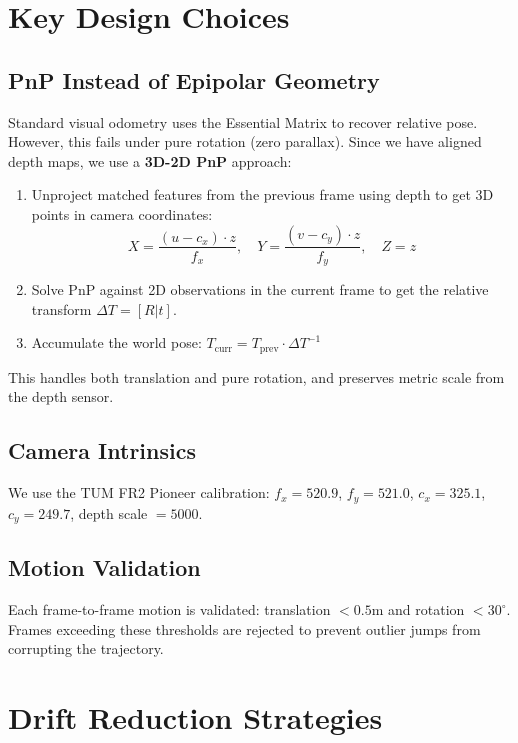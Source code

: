 \documentclass[12pt,a4paper]{article}
\begin{document}
\section{Key Design Choices}

\subsection{PnP Instead of Epipolar Geometry}

Standard visual odometry uses the Essential Matrix to recover relative pose. However, this fails under pure rotation (zero parallax). Since we have aligned depth maps, we use a \textbf{3D-2D PnP} approach:

\begin{enumerate}
    \item Unproject matched features from the previous frame using depth to get 3D points in camera coordinates:
    \[
        X = \frac{(u - c_x) \cdot z}{f_x}, \quad
        Y = \frac{(v - c_y) \cdot z}{f_y}, \quad
        Z = z
    \]
    \item Solve PnP against 2D observations in the current frame to get the relative transform $\Delta T = [R | t]$.
    \item Accumulate the world pose: $T_{\text{curr}} = T_{\text{prev}} \cdot \Delta T^{-1}$
\end{enumerate}

This handles both translation and pure rotation, and preserves metric scale from the depth sensor.

\subsection{Camera Intrinsics}

We use the TUM FR2 Pioneer calibration:
$f_x = 520.9$, $f_y = 521.0$, $c_x = 325.1$, $c_y = 249.7$, depth scale $= 5000$.

\subsection{Motion Validation}

Each frame-to-frame motion is validated: translation $< 0.5$m and rotation $< 30^\circ$. Frames exceeding these thresholds are rejected to prevent outlier jumps from corrupting the trajectory.

\section{Drift Reduction Strategies}
\end{document}
